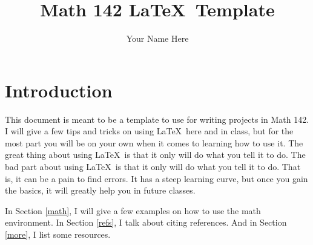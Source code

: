 \documentclass{amsart}
\title{Math 142 \LaTeX\ Template}
\author{Your Name Here}
\begin{document}
	

\maketitle

	

\section{Introduction} %

   This document is meant to be a template to use for writing projects in Math 142. I will give a few tips and tricks on using \LaTeX\ here and in class, but for the most part you will be on your own when it comes to learning how to use it. The great thing about using \LaTeX\ is that it only will do what you tell it to do. The bad part about using \LaTeX\ is that it only will do what you tell it to do. That is, it can be a pain to find errors. It has a steep learning curve, but once you gain the basics, it will greatly help you in future classes. 









In Section \ref{math}, I will give a few examples on how to use the math environment. In Section \ref{refs}, I talk about citing references. And in Section \ref{more}, I list some resources.  
\end{document}
